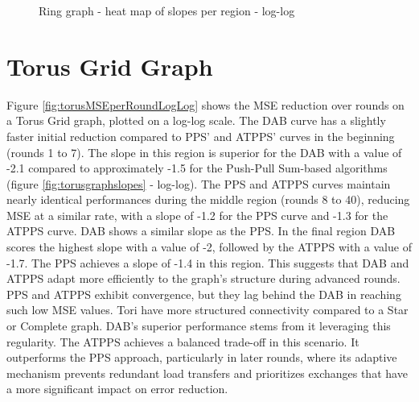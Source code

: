 \begin{figure}[h]
    \centering
    \caption{Ring graph - heat map of slopes per region - log-log}
    \label{fig:ringgraphslopes}
\end{figure}

\section{Torus Grid Graph}\label{sec:torusgridGraph}
Figure \ref{fig:torusMSEperRoundLogLog} shows the MSE reduction over rounds on a Torus Grid graph, plotted on a log-log scale. The DAB curve has a slightly faster initial reduction compared to PPS' and ATPPS' curves in the beginning (rounds 1 to 7). The slope in this region is superior for the DAB with a value of -2.1 compared to approximately -1.5 for the Push-Pull Sum-based algorithms (figure \ref{fig:torusgraphslopes} - log-log). The PPS and ATPPS curves maintain nearly identical performances during the middle region (rounds 8 to 40), reducing MSE at a similar rate, with a slope of -1.2 for the PPS curve and -1.3 for the ATPPS curve. DAB shows a similar slope as the PPS. In the final region DAB scores the highest slope with a value of -2, followed by the ATPPS with a value of -1.7. The PPS achieves a slope of -1.4 in this region. This suggests that DAB and ATPPS adapt more efficiently to the graph's structure during advanced rounds. PPS and ATPPS exhibit convergence, but they lag behind the DAB in reaching such low MSE values. Tori have more structured connectivity compared to a Star or Complete graph. DAB's superior performance stems from it leveraging this regularity. The ATPPS achieves a balanced trade-off in this scenario. It outperforms the PPS approach, particularly in later rounds, where its adaptive mechanism prevents redundant load transfers and prioritizes exchanges that have a more significant impact on error reduction.


